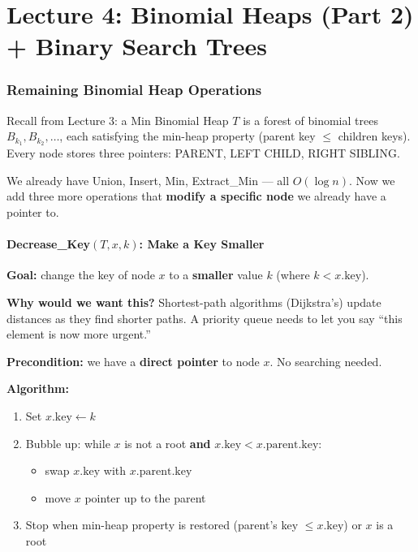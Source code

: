 \documentclass[11pt]{article}
\begin{document}
\part*{\textcolor{utnavy}{Lecture 4: Binomial Heaps (Part 2) + Binary Search Trees}}
\setcounter{section}{0}

\section{Remaining Binomial Heap Operations}

Recall from Lecture 3: a \textcolor{rustW}{Min Binomial Heap} $T$ is a forest of binomial trees $B_{k_1}, B_{k_2}, \ldots$, each satisfying the \textcolor{rustW}{min-heap property} (parent key $\leq$ children keys). Every node stores three pointers: \textcolor{rustW}{PARENT}, \textcolor{greenO}{LEFT CHILD}, \textcolor{heapblue}{RIGHT SIBLING}.

We already have Union, Insert, Min, Extract\_Min — all $O(\log n)$. Now we add three more operations that \textbf{modify a specific node} we already have a pointer to.

\subsection{Decrease\_Key$(T, x, k)$: Make a Key Smaller}

\textcolor{heapblue}{\textbf{Goal:}} change the key of node $x$ to a \textbf{smaller} value $k$ (where $k < x.\text{key}$).

\textbf{Why would we want this?} Shortest-path algorithms (Dijkstra's) update distances as they find shorter paths. A priority queue needs to let you say ``this element is now more urgent.''

\begin{defbox}
\textbf{Precondition:} we have a \textbf{direct pointer} to node $x$. No searching needed.

\textbf{Algorithm:}
\begin{enumerate}[leftmargin=1.4em,itemsep=2pt]
    \item Set $x.\text{key} \leftarrow k$
    \item \textcolor{rustW}{Bubble up}: while $x$ is not a root \textbf{and} $x.\text{key} < x.\text{parent}.\text{key}$:
    \begin{itemize}[leftmargin=1.2em]
        \item swap $x.\text{key}$ with $x.\text{parent}.\text{key}$
        \item move $x$ pointer up to the parent
    \end{itemize}
    \item Stop when min-heap property is restored (parent's key $\leq x.\text{key}$) or $x$ is a root
\end{enumerate}
\end{defbox}
\end{document}
